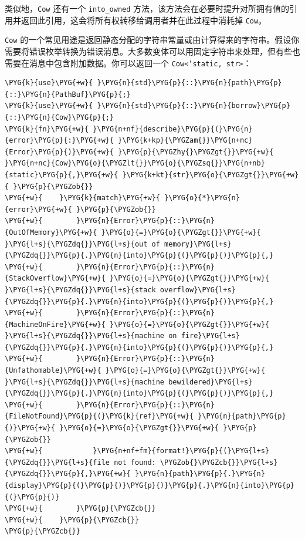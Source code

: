 类似地，\texttt{Cow} 还有一个 \texttt{into\_owned} 方法，该方法会在必要时提升对所拥有值的引用并返回此引用，这会将所有权转移给调用者并在此过程中消耗掉 \texttt{Cow}。

\texttt{Cow} 的一个常见用途是返回静态分配的字符串常量或由计算得来的字符串。假设你需要将错误枚举转换为错误消息。大多数变体可以用固定字符串来处理，但有些也需要在消息中包含附加数据。你可以返回一个 \texttt{Cow<'static, str>}：

\begin{Verbatim}[commandchars=\\\{\},breaklines=true,breakanywhere=true,fontsize=\codefont,xleftmargin=17bp]
\PYG{k}{use}\PYG{+w}{ }\PYG{n}{std}\PYG{p}{::}\PYG{n}{path}\PYG{p}{::}\PYG{n}{PathBuf}\PYG{p}{;}
\PYG{k}{use}\PYG{+w}{ }\PYG{n}{std}\PYG{p}{::}\PYG{n}{borrow}\PYG{p}{::}\PYG{n}{Cow}\PYG{p}{;}
\PYG{k}{fn}\PYG{+w}{ }\PYG{n+nf}{describe}\PYG{p}{(}\PYG{n}{error}\PYG{p}{:}\PYG{+w}{ }\PYG{k+kp}{\PYGZam{}}\PYG{n+nc}{Error}\PYG{p}{)}\PYG{+w}{ }\PYG{p}{\PYGZhy{}\PYGZgt{}}\PYG{+w}{ }\PYG{n+nc}{Cow}\PYG{o}{\PYGZlt{}}\PYG{o}{\PYGZsq{}}\PYG{n+nb}{static}\PYG{p}{,}\PYG{+w}{ }\PYG{k+kt}{str}\PYG{o}{\PYGZgt{}}\PYG{+w}{ }\PYG{p}{\PYGZob{}}
\PYG{+w}{    }\PYG{k}{match}\PYG{+w}{ }\PYG{o}{*}\PYG{n}{error}\PYG{+w}{ }\PYG{p}{\PYGZob{}}
\PYG{+w}{        }\PYG{n}{Error}\PYG{p}{::}\PYG{n}{OutOfMemory}\PYG{+w}{ }\PYG{o}{=}\PYG{o}{\PYGZgt{}}\PYG{+w}{ }\PYG{l+s}{\PYGZdq{}}\PYG{l+s}{out of memory}\PYG{l+s}{\PYGZdq{}}\PYG{p}{.}\PYG{n}{into}\PYG{p}{(}\PYG{p}{)}\PYG{p}{,}
\PYG{+w}{        }\PYG{n}{Error}\PYG{p}{::}\PYG{n}{StackOverflow}\PYG{+w}{ }\PYG{o}{=}\PYG{o}{\PYGZgt{}}\PYG{+w}{ }\PYG{l+s}{\PYGZdq{}}\PYG{l+s}{stack overflow}\PYG{l+s}{\PYGZdq{}}\PYG{p}{.}\PYG{n}{into}\PYG{p}{(}\PYG{p}{)}\PYG{p}{,}
\PYG{+w}{        }\PYG{n}{Error}\PYG{p}{::}\PYG{n}{MachineOnFire}\PYG{+w}{ }\PYG{o}{=}\PYG{o}{\PYGZgt{}}\PYG{+w}{ }\PYG{l+s}{\PYGZdq{}}\PYG{l+s}{machine on fire}\PYG{l+s}{\PYGZdq{}}\PYG{p}{.}\PYG{n}{into}\PYG{p}{(}\PYG{p}{)}\PYG{p}{,}
\PYG{+w}{        }\PYG{n}{Error}\PYG{p}{::}\PYG{n}{Unfathomable}\PYG{+w}{ }\PYG{o}{=}\PYG{o}{\PYGZgt{}}\PYG{+w}{ }\PYG{l+s}{\PYGZdq{}}\PYG{l+s}{machine bewildered}\PYG{l+s}{\PYGZdq{}}\PYG{p}{.}\PYG{n}{into}\PYG{p}{(}\PYG{p}{)}\PYG{p}{,}
\PYG{+w}{        }\PYG{n}{Error}\PYG{p}{::}\PYG{n}{FileNotFound}\PYG{p}{(}\PYG{k}{ref}\PYG{+w}{ }\PYG{n}{path}\PYG{p}{)}\PYG{+w}{ }\PYG{o}{=}\PYG{o}{\PYGZgt{}}\PYG{+w}{ }\PYG{p}{\PYGZob{}}
\PYG{+w}{            }\PYG{n+nf+fm}{format!}\PYG{p}{(}\PYG{l+s}{\PYGZdq{}}\PYG{l+s}{file not found: \PYGZob{}\PYGZcb{}}\PYG{l+s}{\PYGZdq{}}\PYG{p}{,}\PYG{+w}{ }\PYG{n}{path}\PYG{p}{.}\PYG{n}{display}\PYG{p}{(}\PYG{p}{)}\PYG{p}{)}\PYG{p}{.}\PYG{n}{into}\PYG{p}{(}\PYG{p}{)}
\PYG{+w}{        }\PYG{p}{\PYGZcb{}}
\PYG{+w}{    }\PYG{p}{\PYGZcb{}}
\PYG{p}{\PYGZcb{}}
\end{Verbatim}

